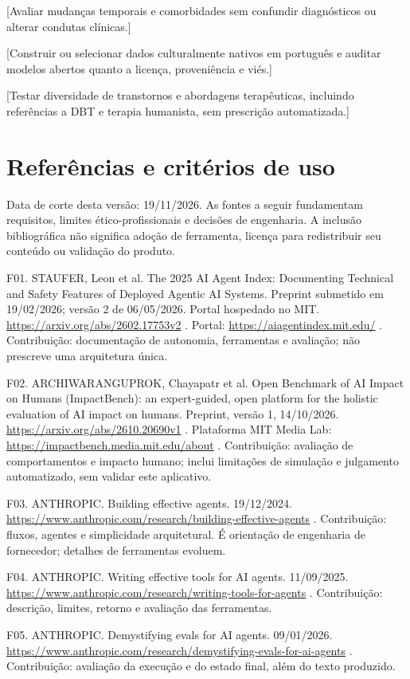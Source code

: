 \documentclass[11pt,a4paper]{article}
\newcommand{\pendencia}[1]{\textcolor{pendente}{[#1]}}
\begin{document}
\pendencia{Avaliar mudanças temporais e comorbidades sem confundir diagnósticos ou alterar condutas clínicas.}

\pendencia{Construir ou selecionar dados culturalmente nativos em português e auditar modelos abertos quanto a licença, proveniência e viés.}

\pendencia{Testar diversidade de transtornos e abordagens terapêuticas, incluindo referências a DBT e terapia humanista, sem prescrição automatizada.}

\section{Referências e critérios de uso}
Data de corte desta versão: 19/11/2026. As fontes a seguir fundamentam requisitos, limites ético-profissionais e decisões de engenharia. A inclusão bibliográfica não significa adoção de ferramenta, licença para redistribuir seu conteúdo ou validação do produto.

F01. STAUFER, Leon et al. The 2025 AI Agent Index: Documenting Technical and Safety Features of Deployed Agentic AI Systems. Preprint submetido em 19/02/2026; versão 2 de 06/05/2026. Portal hospedado no MIT. \url{https://arxiv.org/abs/2602.17753v2} . Portal: \url{https://aiagentindex.mit.edu/} . Contribuição: documentação de autonomia, ferramentas e avaliação; não prescreve uma arquitetura única.

F02. ARCHIWARANGUPROK, Chayapatr et al. Open Benchmark of AI Impact on Humans (ImpactBench): an expert-guided, open platform for the holistic evaluation of AI impact on humans. Preprint, versão 1, 14/10/2026. \url{https://arxiv.org/abs/2610.20690v1} . Plataforma MIT Media Lab: \url{https://impactbench.media.mit.edu/about} . Contribuição: avaliação de comportamentos e impacto humano; inclui limitações de simulação e julgamento automatizado, sem validar este aplicativo.

F03. ANTHROPIC. Building effective agents. 19/12/2024. \url{https://www.anthropic.com/research/building-effective-agents} . Contribuição: fluxos, agentes e simplicidade arquitetural. É orientação de engenharia de fornecedor; detalhes de ferramentas evoluem.

F04. ANTHROPIC. Writing effective tools for AI agents. 11/09/2025. \url{https://www.anthropic.com/research/writing-tools-for-agents} . Contribuição: descrição, limites, retorno e avaliação das ferramentas.

F05. ANTHROPIC. Demystifying evals for AI agents. 09/01/2026. \url{https://www.anthropic.com/research/demystifying-evals-for-ai-agents} . Contribuição: avaliação da execução e do estado final, além do texto produzido.
\end{document}
